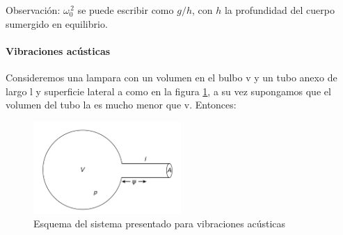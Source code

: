 \documentclass[a4paper,spanish]{article}
\numberwithin{equation}{section}
\begin{document}
Observación: $\omega_0^{\,2}$ se puede escribir como $g/h$, con $h$ la profundidad del cuerpo sumergido en equilibrio.
		

\paragraph{Vibraciones ac\'usticas}

Consideremos una lampara con un volumen en el bulbo v y un tubo anexo de largo l y superficie lateral a como en la figura \ref{fig:bombilla}, a su vez supongamos que el volumen del tubo la es mucho menor que v. Entonces:\\

\begin{figure}[H]
  \centering
  \includegraphics[width=0.5\textwidth]{Imagenes/bombilla.png}
  \caption{Esquema del sistema presentado para vibraciones ac\'usticas}
 \label{fig:bombilla}
\end{figure}
\end{document}
